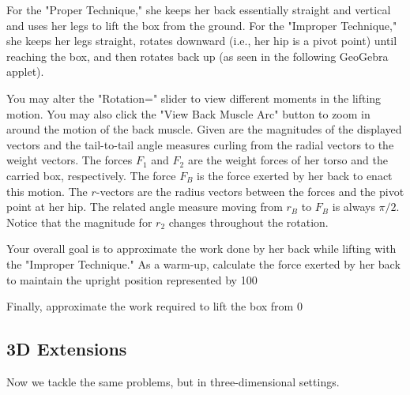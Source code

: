 \documentclass{ximera}
\begin{document}
For the "Proper Technique," she keeps her back essentially straight and vertical and uses her legs to lift the box from the ground. For the "Improper Technique," she keeps her legs straight, rotates downward (i.e., her hip is a pivot point) until reaching the box, and then rotates back up (as seen in the following GeoGebra applet).

You may alter the "Rotation=" slider to view different moments in the lifting motion. You may also click the "View Back Muscle Arc" button to zoom in around the motion of the back muscle. Given are the magnitudes of the displayed vectors and the tail-to-tail angle measures curling from the radial vectors to the weight vectors. The forces $F_1$ and $F_2$ are the weight forces of her torso and the carried box, respectively. The force $F_B$ is the force exerted by her back to enact this motion. The $r$-vectors are the radius vectors between the forces and the pivot point at her hip. The related angle measure moving from $r_B$ to $F_B$ is always $\pi/2$. Notice that the magnitude for $r_2$ changes throughout the rotation.

\begin{center}
\end{center}

Your overall goal is to approximate the work done by her back while lifting with the "Improper Technique." As a warm-up, calculate the force exerted by her back to maintain the upright position represented by 100%

Finally, approximate the work required to lift the box from 0%

\subsection{3D Extensions}

Now we tackle the same problems, but in three-dimensional settings.
\end{document}
